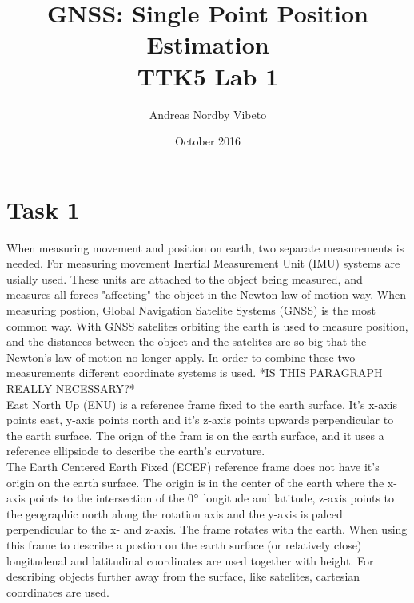 \documentclass{article}
\title{GNSS: Single Point Position Estimation \\
	   \normalsize{TTK5 Lab 1}}
\author{Andreas Nordby Vibeto}
\date{October 2016}
\begin{document}
\maketitle

\section*{Task 1}

When measuring movement and position on earth, two separate measurements is needed. For measuring movement Inertial Measurement Unit (IMU) systems are usially used. These units are attached to the object being measured, and measures all forces "affecting" the object in the Newton law of motion way. When measuring postion, Global Navigation Satelite Systems (GNSS) is the most common way. With GNSS satelites orbiting the earth is used to measure position, and the distances between the object and the satelites are so big that the Newton's law of motion no longer apply. In order to combine these two measurements different coordinate systems is used. *IS THIS PARAGRAPH REALLY NECESSARY?*\\

East North Up (ENU) is a reference frame fixed to the earth surface. It's x-axis points east, y-axis points north and it's z-axis points upwards perpendicular to the earth surface. The orign of the fram is on the earth surface, and it uses a reference ellipsiode to describe the earth's curvature.\\

The Earth Centered Earth Fixed (ECEF) reference frame does not have it's origin on the earth surface. The origin is in the center of the earth where the x-axis points to the intersection of the 0$\degree$ longitude and latitude, z-axis points to the geographic north along the rotation axis and the y-axis is palced perpendicular to the x- and z-axis. The frame rotates with the earth. When using this frame to describe a postion on the earth surface (or relatively close) longitudenal and latitudinal coordinates are used together with height. For describing objects further away from the surface, like satelites, cartesian coordinates are used.
\end{document}
